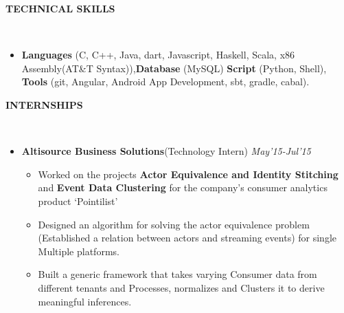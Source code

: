 \documentclass[a4paper,10pt]{article}
\newcommand{\lsep}{-0.5cm}
\newcommand{\resheading}[1]{{\small \colorbox{mygrey}{\begin{minipage}{0.975\textwidth}{\textbf{#1 \vphantom{p\^{E}}}}\end{minipage}}}}
\begin{document}
        \resheading{\textbf{TECHNICAL SKILLS} }\\[\lsep]
        \begin{itemize}
        \item \noindent \textbf{Languages} (C, C++, Java, dart, Javascript, Haskell,
          Scala, x86 Assembly(AT\&T Syntax)),\textbf{Database} (MySQL) \textbf{Script}
          (Python, Shell), \textbf{Tools} (git, Angular, Android App Development, sbt,
          gradle, cabal).
        \end{itemize}

        \resheading{\textbf{INTERNSHIPS} }\\[\lsep]
        \begin{itemize}
        \item \textbf{  Altisource Business Solutions}(Technology Intern) \hfill  \textit{May'15-Jul'15}
          \vspace{-2mm}
          \begin{itemize} \itemsep -2pt
          \item Worked on the projects \textbf{Actor Equivalence and Identity Stitching} and \textbf{Event Data Clustering}
            for the company's consumer analytics product `Pointilist'
          \item Designed an algorithm for solving the actor equivalence problem
            (Established a relation between actors and streaming events) for
            single Multiple platforms.
          \item Built a generic
            framework that takes varying
            Consumer data from
            different tenants and
            Processes, normalizes and
            Clusters it to derive
            meaningful inferences.
          \end{itemize}
        \end{itemize}
\end{document}
